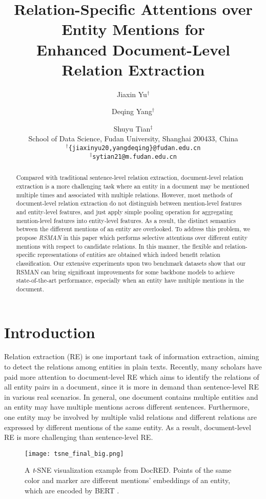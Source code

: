 \documentclass[11pt]{article}
\title{Relation-Specific Attentions over Entity Mentions for\\ Enhanced Document-Level Relation Extraction}
\author{Jiaxin Yu$^{\dagger}$ \and Deqing Yang$^{\dagger}$ \Thanks {Corresponding author.} \and Shuyu Tian$^{\ddagger}$ \\
        School of Data Science, Fudan University, Shanghai 200433, China \\
        $^{\dagger}$\texttt{\{jiaxinyu20,yangdeqing\}@fudan.edu.cn}\\
        $^{\ddagger}$\texttt{sytian21@m.fudan.edu.cn}
        }
\begin{document}
\maketitle
\begin{abstract}
Compared with traditional sentence-level relation extraction, document-level relation extraction is a more challenging task where an entity in a document may be mentioned multiple times and associated with multiple relations. However, most methods of document-level relation extraction do not distinguish between mention-level features and entity-level features, and just apply simple pooling operation for aggregating mention-level features into entity-level features. As a result, the distinct semantics between the different mentions of an entity are overlooked. To address this problem, we propose \emph{RSMAN} in this paper which performs selective attentions over different entity mentions with respect to candidate relations. In this manner, the flexible and relation-specific representations of entities are obtained which indeed benefit relation classification. Our extensive experiments upon two benchmark datasets show that our RSMAN can bring significant improvements for some backbone models to achieve state-of-the-art performance, especially when an entity have multiple mentions in the document.\footnotemark[1]     

\end{abstract}


\section{Introduction}\label{intro}
Relation extraction (RE) is one important task of information extraction, aiming to detect the relations among entities in plain texts. Recently, many scholars have paid more attention to document-level RE \cite{sahu-etal-2019-inter,yao-etal-2019-docred} which aims to identify the relations of all entity pairs in a document, since it is more in demand than sentence-level RE in various real scenarios. In general, one document contains multiple entities and an entity may have multiple mentions across different sentences. Furthermore, one entity may be involved by multiple valid relations and different relations are expressed by different mentions of the same entity. As a result, document-level RE is more challenging than sentence-level RE.
\begin{figure}[t]
\centering
    \texttt{[image: tsne\_final\_big.png]}
\caption{A \emph{t}-SNE visualization example from DocRED. Points of the same color and marker are different mentions' embeddings of an entity, which are encoded by BERT \cite{devlin-etal-2019-bert}.}
    \label{fig:tsne}
\end{figure}
\end{document}
